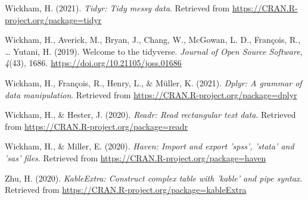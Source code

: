 \documentclass[
  english,
  man]{apa6}
\newlength{\cslhangindent}
\newenvironment{cslreferences}%
  {\setlength{\parindent}{0pt}%
  \everypar{\setlength{\hangindent}{\cslhangindent}}\ignorespaces}%
  {\par}
\begin{document}
\begin{cslreferences}
\leavevmode\hypertarget{ref-R-tidyr}{}%
Wickham, H. (2021). \emph{Tidyr: Tidy messy data}. Retrieved from \url{https://CRAN.R-project.org/package=tidyr}

\leavevmode\hypertarget{ref-R-tidyverse}{}%
Wickham, H., Averick, M., Bryan, J., Chang, W., McGowan, L. D., François, R., \ldots{} Yutani, H. (2019). Welcome to the tidyverse. \emph{Journal of Open Source Software}, \emph{4}(43), 1686. \url{https://doi.org/10.21105/joss.01686}

\leavevmode\hypertarget{ref-R-dplyr}{}%
Wickham, H., François, R., Henry, L., \& Müller, K. (2021). \emph{Dplyr: A grammar of data manipulation}. Retrieved from \url{https://CRAN.R-project.org/package=dplyr}

\leavevmode\hypertarget{ref-R-readr}{}%
Wickham, H., \& Hester, J. (2020). \emph{Readr: Read rectangular text data}. Retrieved from \url{https://CRAN.R-project.org/package=readr}

\leavevmode\hypertarget{ref-R-haven}{}%
Wickham, H., \& Miller, E. (2020). \emph{Haven: Import and export 'spss', 'stata' and 'sas' files}. Retrieved from \url{https://CRAN.R-project.org/package=haven}

\leavevmode\hypertarget{ref-R-kableExtra}{}%
Zhu, H. (2020). \emph{KableExtra: Construct complex table with 'kable' and pipe syntax}. Retrieved from \url{https://CRAN.R-project.org/package=kableExtra}
\end{cslreferences}

\endgroup
\end{document}
